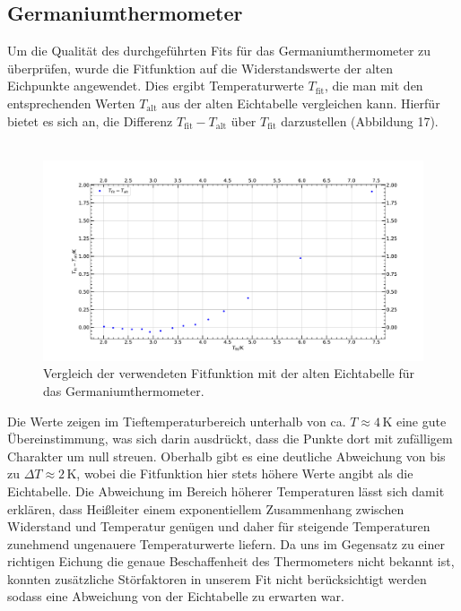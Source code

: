 \documentclass[german,  %
parskip=full,  %
]{scrartcl}
\begin{document}
\subsection{Germaniumthermometer}
Um die Qualität des durchgeführten Fits für das Germaniumthermometer zu überprüfen, wurde die Fitfunktion auf die Widerstandswerte der alten Eichpunkte angewendet. Dies ergibt Temperaturwerte \(T_{\mathrm{fit}}\), die man mit den entsprechenden Werten \(T_{\mathrm{alt}}\) aus der alten Eichtabelle vergleichen kann. Hierfür bietet es sich an, die Differenz \(T_{\mathrm{fit}}- T_{\mathrm{alt}}\) über \(T_{\mathrm{fit}}\) darzustellen (Abbildung 17). \\\\
\begin{figure}[h!]\centering
\includegraphics[width=\textwidth]{Alte_Eiche.pdf}
\caption{Vergleich der verwendeten Fitfunktion mit der alten Eichtabelle für das Germaniumthermometer.}
\end{figure}


Die Werte zeigen im Tieftemperaturbereich unterhalb von ca. \(T\approx 4 \,\mathrm{K}\) eine gute Übereinstimmung, was sich darin ausdrückt, dass die Punkte dort mit zufälligem Charakter um null streuen. Oberhalb gibt es eine deutliche Abweichung von bis zu \(\Delta T \approx 2\,\mathrm{K}\), wobei die Fitfunktion hier stets höhere Werte angibt als die Eichtabelle. Die Abweichung im Bereich höherer Temperaturen lässt sich damit erklären, dass Heißleiter einem exponentiellem Zusammenhang zwischen Widerstand und Temperatur genügen und daher für steigende Temperaturen zunehmend ungenauere Temperaturwerte liefern. Da uns im Gegensatz zu einer richtigen Eichung die genaue Beschaffenheit des Thermometers nicht bekannt ist, konnten zusätzliche Störfaktoren in unserem Fit nicht berücksichtigt werden sodass eine Abweichung von der Eichtabelle zu erwarten war.
\end{document}
